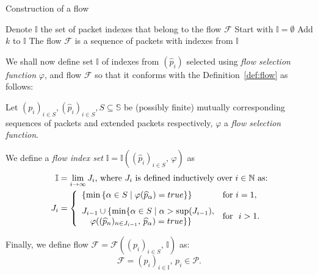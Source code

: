 \begin{algorithm}
    \caption{Construction of a flow}
    \label{alg:flow-construction}
    \begin{algorithmic}[1]
        \STATE Denote $\mathbb{I}$ the set of packet indexes that belong to the flow $\mathcal{F}$
        \STATE Start with $\mathbb{I} = \emptyset$
            \STATE Add $k$ to $\mathbb{I}$
        \ENDWHILE
        \STATE The flow $\mathcal{F}$ is a sequence of packets with indexes from $\mathbb{I}$
    \end{algorithmic}
\end{algorithm}

We shall now define set $\mathbb{I}$ of indexes from $(\widehat{p}_i)$ selected using \emph{flow selection function} $\varphi$, and flow $\mathcal{F}$ so that it conforms with the Definition~\ref{def:flow} as follows:
\begin{defn}\label{def:formal-flow}
Let $(p_i)_{i \in S}, (\widehat{p}_i)_{i \in S}, S \subseteq \mathbb{S}$ be (possibly finite) mutually corresponding sequences of packets and extended packets respectively, $\varphi$ a \emph{flow selection function}.

We define a \emph{flow index set} $\mathbb{I} = \mathbb{I}\left((\widehat{p}_i)_{i \in S},\, \varphi\right)$ as 
\begin{align*}
\mathbb{I} &= \lim_{i \to \infty} J_i \text{, where } J_i \text{ is defined inductively over }i \in \mathbb{N} \text{ as:} \notag\\
J_i &= \left\{
    \begin{array}{ll}
        \left\{\min\left\{ \alpha \in S \mid \varphi(\widehat{p}_{\alpha}) = true \right\}\right\} & \text{for } i = 1 , \\[0.7em]
        J_{i-1} \cup \{\min\{ \alpha \in S \mid \alpha > \sup(J_{i-1}), & \multirow{2}{*}{\text{for } $i > 1$.} \\
        \quad \varphi((\widehat{p}_n)_{n\in J_{i-1}},\, \widehat{p}_{\alpha}) = true \}\} &
    \end{array}\right.
\end{align*}

Finally, we define flow $\mathcal{F} = \mathcal{F}\left((p_i)_{i \in S},\, \mathbb{I}\right)$ as:
\begin{equation*}
    \mathcal{F} = (p_i)_{i \in \mathbb{I}},\, p_i \in \mathcal{P}.
\end{equation*}

\end{defn}

